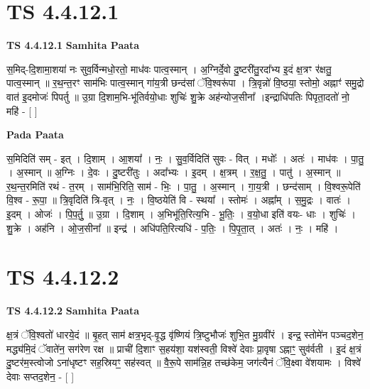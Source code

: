 \documentclass[17pt]{extarticle}
\begin{document}

\section{ TS 4.4.12.1 }

\textbf{TS 4.4.12.1 } \newline
\textbf{Samhita Paata} \newline

स॒मिद्-दि॒शामा॒शया॑ नः सुव॒र्विन्मधो॒रतो॒ माध॑वः पात्व॒स्मान् । अ॒ग्निर्दे॒वो दु॒ष्टरी॑तु॒रदा᳚भ्य इ॒दं क्ष॒त्रꣳ र॑क्षतु॒ पात्व॒स्मान् ॥ र॒थ॒न्त॒रꣳ साम॑भिः पात्व॒स्मान् गा॑य॒त्री छन्द॑सां ॅवि॒श्वरू॑पा । त्रि॒वृन्नो॑ वि॒ष्ठया॒ स्तोमो॒ अह्नाꣳ॑ समु॒द्रो वात॑ इ॒दमोजः॑ पिपर्तु ॥ उ॒ग्रा दि॒शाम॒भि-भू॑तिर्वयो॒धाः शुचिः॑ शु॒क्रे अह॑न्योज॒सीना᳚ ।इन्द्राधि॑पतिः पिपृता॒दतो॑ नो॒ महि॑ - [  ] \newline

\textbf{Pada Paata} \newline

स॒मिदिति॑ सम् - इत् । दि॒शाम् । आ॒शया᳚ । नः॒ । सु॒व॒र्विदिति॑ सुवः - वित् । मधोः᳚ । अतः॑ । माध॑वः । पा॒तु॒ । अ॒स्मान् ॥ अ॒ग्निः । दे॒वः । दु॒ष्टरी॑तुः । अदा᳚भ्यः । इ॒दम् । क्ष॒त्रम् । र॒क्ष॒तु॒ । पातु॑ । अ॒स्मान् ॥ र॒थ॒न्त॒रमिति॑ रथं - त॒रम् । साम॑भि॒रिति॒ साम॑ - भिः॒ । पा॒तु॒ । अ॒स्मान् । गा॒य॒त्री । छन्द॑साम् । वि॒श्वरू॒पेति॑ वि॒श्व - रू॒पा॒ ॥ त्रि॒वृदिति॑ त्रि-वृत् । नः॒ । वि॒ष्ठयेति॑ वि - स्थया᳚ । स्तोमः॑ । अह्ना᳚म् । स॒मु॒द्रः । वातः॑ । इ॒दम् । ओजः॑ । पि॒प॒र्तु॒ ॥ उ॒ग्रा । दि॒शाम् । अ॒भिभू॑ति॒रित्य॒भि - भू॒तिः॒ । व॒यो॒धा इति॑ वयः- धाः । शुचिः॑ । शु॒क्रे । अह॑नि । ओ॒ज॒सीना᳚ ॥ इन्द्र॑ । अधि॑पति॒रित्यधि॑ - प॒तिः॒ । पि॒पृ॒ता॒त् । अतः॑ । नः॒ । महि॑ ।  \newline





\section{ TS 4.4.12.2 }

\textbf{TS 4.4.12.2 } \newline
\textbf{Samhita Paata} \newline

क्ष॒त्रं ॅवि॒श्वतो॑ धारये॒दं ॥ बृ॒हत् साम॑ क्षत्र॒भृद्-वृ॒द्ध वृ॑ष्णियं त्रि॒ष्टुभौजः॑ शुभि॒त मु॒ग्रवी॑रं । इन्द्र॒ स्तोमे॑न पञ्चद॒शेन॒ मद्ध्य॑मि॒दं ॅवाते॑न॒ सग॑रेण रक्ष ॥ प्राची॑ दि॒शाꣳ स॒हय॑शा॒ यश॑स्वती॒ विश्वे॑ देवाः प्रा॒वृषा ऽह्नाꣳ॒॒ सुव॑र्वती । इ॒दं क्ष॒त्रं दु॒ष्टर॑म॒स्त्वोजो ऽना॑धृष्टꣳ सह॒स्रियꣳ॒॒ सह॑स्वत् ॥ वै॒रू॒पे साम॑न्नि॒ह तच्छ॑केम॒ जग॑त्यैनं ॅवि॒क्ष्वा वे॑शयामः । विश्वे॑ देवाः सप्तद॒शेन॒ - [  ] \newline
\end{document}

